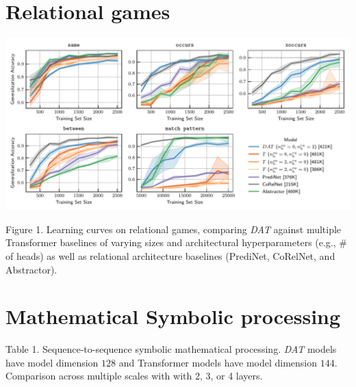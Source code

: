 \documentclass[a0,landscape,pdftex]{a0poster}
\date{}
\begin{document}
\thispagestyle{empty}

\Large


\begin{minipage}{50cm}

\vskip-11cm
\section*{Relational games}
\begin{center}
\includegraphics[width=\textwidth]{../figs/experiments/relgames/relgames_learning_curves_baseline_comparisons.pdf}
\end{center}
{\rm Figure 1. Learning curves on relational games, comparing \textit{DAT} against multiple Transformer baselines of varying sizes and architectural hyperparameters (e.g., \# of heads) as well as relational architecture baselines (PrediNet, CoRelNet, and Abstractor).}
\vskip2cm


\section*{Mathematical Symbolic processing}

\begin{center}
    {\normalsize
    
    }
\end{center}
{\rm Table 1. Sequence-to-sequence symbolic mathematical processing. \textit{DAT} models have model dimension $128$ and Transformer models have model dimension $144$. Comparison across multiple scales with with 2, 3, or 4 layers.}



\end{minipage}
\end{document}
